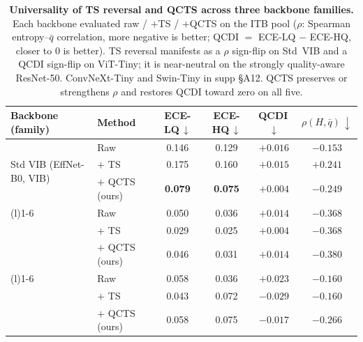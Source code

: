 \begin{table}[!tbp]
\centering
\caption{\textbf{Universality of TS reversal and QCTS across three backbone families.}
Each backbone evaluated raw / $+$TS / $+$QCTS on the ITB pool ($\rho$: Spearman entropy--$\bar q$ correlation, more negative is better; QCDI $=$ ECE-LQ $-$ ECE-HQ, closer to $0$ is better). TS reversal manifests as a $\rho$ sign-flip on Std~VIB and a QCDI sign-flip on ViT-Tiny; it is near-neutral on the strongly quality-aware ResNet-50. ConvNeXt-Tiny and Swin-Tiny in supp \S A12. QCTS preserves or strengthens $\rho$ and restores QCDI toward zero on all five.}
\label{tab:universality}
\vspace{4pt}
\footnotesize
\setlength{\tabcolsep}{5pt}
\renewcommand{\arraystretch}{1.05}
\begin{tabular}{llcccc}
\toprule
Backbone (family) & Method & ECE-LQ\,$\downarrow$ & ECE-HQ\,$\downarrow$ & QCDI\,$\downarrow$ & $\rho(H,\bar q)\,\downarrow$ \\
\midrule
\multirow{3}{*}{Std VIB (EffNet-B0, VIB)}
  & Raw           & 0.146 & 0.129 & $+0.016$ & $-0.153$ \\
  & $+$ TS        & 0.175 & 0.160 & $+0.015$ & \cellcolor{red!12}$+0.241$ \\
  & $+$ QCTS (ours) & \textbf{0.079} & \textbf{0.075} & \textbf{$+0.004$} & \cellcolor{green!12}$\mathbf{-0.249}$ \\
\addlinespace[2pt]\cmidrule(l){1-6}\addlinespace[2pt]
\multirow{3}{*}{ResNet-50 (CNN)}
  & Raw             & 0.050 & 0.036 & $+0.014$ & $-0.368$ \\
  & $+$ TS          & 0.029 & 0.025 & $+0.004$ & $-0.368$ \\
  & $+$ QCTS (ours) & 0.046 & 0.031 & $+0.014$ & \cellcolor{green!8}$\mathbf{-0.380}$ \\
\addlinespace[2pt]\cmidrule(l){1-6}\addlinespace[2pt]
\multirow{3}{*}{ViT-Tiny (Transformer)}
  & Raw             & 0.058 & 0.036 & $+0.023$ & $-0.160$ \\
  & $+$ TS          & 0.043 & 0.072 & \cellcolor{red!12}$-0.029$ & $-0.160$ \\
  & $+$ QCTS (ours) & 0.058 & 0.075 & $-0.017$ & \cellcolor{green!12}$\mathbf{-0.266}$ \\
\bottomrule
\end{tabular}
\vspace{-4pt}
\end{table}
